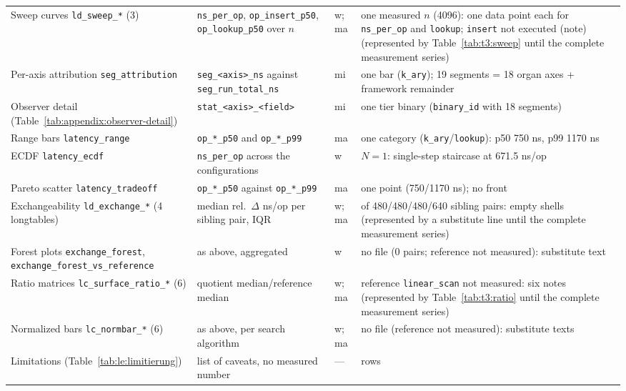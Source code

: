 \begin{footnotesize}
\begin{longtable}{@{}>{\raggedright\arraybackslash}p{4.6cm}>{\raggedright\arraybackslash}p{3.4cm}>{\raggedright\arraybackslash}p{1.1cm}>{\raggedright\arraybackslash}p{5.3cm}@{}}
Sweep curves \texttt{ld\_\allowbreak{}sweep\_*} (3) & \texttt{ns\_per\_op}, \texttt{op\_insert\_p50},
  \texttt{op\_lookup\_p50} over $n$ & w; ma & one measured $n$ (4096): one data point each for
  \texttt{ns\_per\_op} and \texttt{lookup}; \texttt{insert} not executed (note)
  \ifPlatzhalterAlsTabelle{}(represented by Table~\ref{tab:t3:sweep} until the complete
  measurement series)\fi \\
Per-axis attribution \texttt{seg\_\allowbreak{}attribution} & \texttt{seg\_\allowbreak{}<axis>\_\allowbreak{}ns} against \texttt{seg\_\allowbreak{}run\_\allowbreak{}total\_\allowbreak{}ns} & mi & one bar (\texttt{k\_ary}); 19 segments = 18 organ axes + framework remainder \\
Observer detail (Table~\ref{tab:appendix:observer-detail}) & \texttt{stat\_\allowbreak{}<axis>\_\allowbreak{}<field>} & mi & one tier binary (\texttt{binary\_id} with 18 segments) \\
Range bars \texttt{latency\_\allowbreak{}range} & \texttt{op\_*\_p50} and \texttt{op\_*\_p99} & ma & one category (\texttt{k\_ary}/\texttt{lookup}): p50 750 ns, p99 1170 ns \\
ECDF \texttt{latency\_\allowbreak{}ecdf} & \texttt{ns\_per\_op} across the configurations & w & $N = 1$: single-step staircase at 671.5 ns/op \\
Pareto scatter \texttt{latency\_\allowbreak{}tradeoff} & \texttt{op\_*\_p50} against \texttt{op\_*\_p99} & ma & one point (750/1170 ns); no front \\
Exchangeability \texttt{ld\_\allowbreak{}exchange\_*} (4 longtables) & median rel.\ $\Delta$ ns/op per
  sibling pair, IQR & w; ma & 0 of 480/480/480/640 sibling pairs: empty shells
  \ifPlatzhalterAlsTabelle{}(represented by a substitute line until the complete
  measurement series)\fi \\
Forest plots \texttt{exchange\_\allowbreak{}forest}, \texttt{exchange\_\allowbreak{}forest\_\allowbreak{}vs\_\allowbreak{}reference} & as above, aggregated & w & no file (0 pairs; reference not measured): substitute text \\
Ratio matrices \texttt{lc\_\allowbreak{}surface\_\allowbreak{}ratio\_*} (6) & quotient median/reference median &
  w; ma & reference \texttt{linear\_scan} not measured: six notes
  \ifPlatzhalterAlsTabelle{}(represented by Table~\ref{tab:t3:ratio} until the complete
  measurement series)\fi \\
Normalized bars \texttt{lc\_\allowbreak{}normbar\_*} (6) & as above, per search algorithm & w; ma & no file (reference not measured): substitute texts \\
Limitations (Table~\ref{tab:le:limitierung}) & list of caveats, no measured number & --- & 16 rows \\
\end{longtable}
\end{footnotesize}

